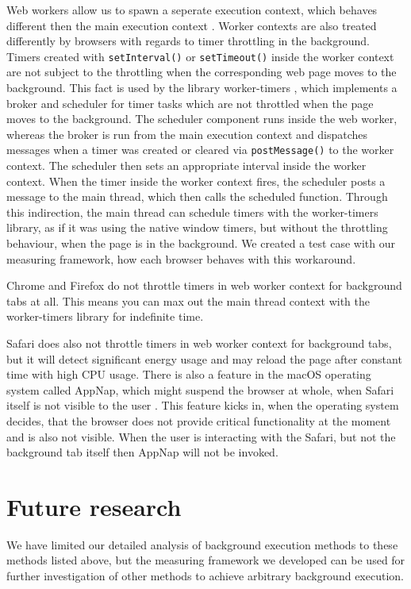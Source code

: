 \documentclass[
	ruledheaders=section,%
	class=report,%
	thesis={type=bachelor},%
	accentcolor=9c,%
	custommargins=true,%
	marginpar=false,%
	parskip=half-,%
	fontsize=11pt,%
]{tudapub}
\begin{document}
  Web workers allow us to spawn a seperate execution context, which behaves different then the main execution context \cite{mdn-worker}. Worker contexts are also treated differently by browsers with regards to timer throttling in the background. Timers created with \texttt{setInterval()} or \texttt{setTimeout()} inside the worker context are not subject to the throttling when the corresponding web page moves to the background. This fact is used by the library worker-timers \cite{worker-timers}, which implements a broker and scheduler for timer tasks which are not throttled when the page moves to the background. The scheduler component runs inside the web worker, whereas the broker is run from the main execution context and dispatches messages when a timer was created or cleared via \texttt{postMessage()} to the worker context. The scheduler then sets an appropriate interval inside the worker context. When the timer inside the worker context fires, the scheduler posts a message to the main thread, which then calls the scheduled function. Through this indirection, the main thread can schedule timers with the worker-timers library, as if it was using the native window timers, but without the throttling behaviour, when the page is in the background. We created a test case with our measuring framework, how each browser behaves with this workaround.
  
  Chrome and Firefox do not throttle timers in web worker context for background tabs at all. This means you can max out the main thread context with the worker-timers library for indefinite time.

  Safari does also not throttle timers in web worker context for background tabs, but it will detect significant energy usage and may reload the page after constant time with high CPU usage. There is also a feature in the macOS operating system called AppNap, which might suspend the browser at whole, when Safari itself is not visible to the user \cite{osx-app-nap}. This feature kicks in, when the operating system decides, that the browser does not provide critical functionality at the moment and is also not visible. When the user is interacting with the Safari, but not the background tab itself then AppNap will not be invoked.
  

  \section{Future research}

  We have limited our detailed analysis of background execution methods to these methods listed above, but the measuring framework we developed can be used for further investigation of other methods to achieve arbitrary background execution.
\end{document}

